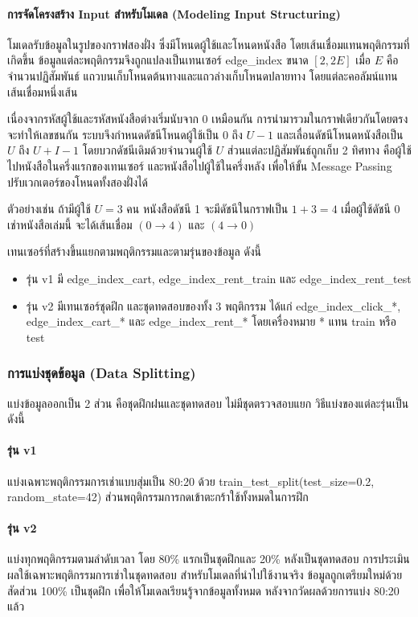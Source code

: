 \paragraph{การจัดโครงสร้าง Input สำหรับโมเดล (Modeling Input Structuring)}
โมเดลรับข้อมูลในรูปของกราฟสองฝั่ง ซึ่งมีโหนดผู้ใช้และโหนดหนังสือ โดยเส้นเชื่อมแทนพฤติกรรมที่เกิดขึ้น ข้อมูลแต่ละพฤติกรรมจึงถูกแปลงเป็นเทนเซอร์ edge\_index ขนาด $[2, 2E]$ เมื่อ $E$ คือจำนวนปฏิสัมพันธ์ แถวบนเก็บโหนดต้นทางและแถวล่างเก็บโหนดปลายทาง โดยแต่ละคอลัมน์แทนเส้นเชื่อมหนึ่งเส้น

เนื่องจากรหัสผู้ใช้และรหัสหนังสือต่างเริ่มนับจาก $0$ เหมือนกัน การนำมารวมในกราฟเดียวกันโดยตรงจะทำให้เลขชนกัน ระบบจึงกำหนดดัชนีโหนดผู้ใช้เป็น $0$ ถึง $U-1$ และเลื่อนดัชนีโหนดหนังสือเป็น $U$ ถึง $U+I-1$ โดยบวกดัชนีเดิมด้วยจำนวนผู้ใช้ $U$ ส่วนแต่ละปฏิสัมพันธ์ถูกเก็บ 2 ทิศทาง คือผู้ใช้ไปหนังสือในครึ่งแรกของเทนเซอร์ และหนังสือไปผู้ใช้ในครึ่งหลัง เพื่อให้ขั้น Message Passing ปรับเวกเตอร์ของโหนดทั้งสองฝั่งได้

ตัวอย่างเช่น ถ้ามีผู้ใช้ $U=3$ คน หนังสือดัชนี 1 จะมีดัชนีในกราฟเป็น $1+3=4$ เมื่อผู้ใช้ดัชนี 0 เช่าหนังสือเล่มนี้ จะได้เส้นเชื่อม $(0 \rightarrow 4)$ และ $(4 \rightarrow 0)$

เทนเซอร์ที่สร้างขึ้นแยกตามพฤติกรรมและตามรุ่นของข้อมูล ดังนี้
\begin{itemize}
    \item รุ่น v1 มี edge\_index\_cart, edge\_index\_rent\_train และ edge\_index\_rent\_test
    \item รุ่น v2 มีเทนเซอร์ชุดฝึก และชุดทดสอบของทั้ง 3 พฤติกรรม ได้แก่ edge\_index\_click\_*, edge\_index\_cart\_* และ edge\_index\_rent\_* โดยเครื่องหมาย * แทน train หรือ test
\end{itemize}

\subsubsection{การแบ่งชุดข้อมูล (Data Splitting)}
แบ่งข้อมูลออกเป็น 2 ส่วน คือชุดฝึกฝนและชุดทดสอบ ไม่มีชุดตรวจสอบแยก วิธีแบ่งของแต่ละรุ่นเป็นดังนี้

\paragraph{รุ่น v1}
แบ่งเฉพาะพฤติกรรมการเช่าแบบสุ่มเป็น 80:20 ด้วย train\_test\_split(test\_size=0.2, random\_state=42) ส่วนพฤติกรรมการกดเข้าตะกร้าใช้ทั้งหมดในการฝึก

\paragraph{รุ่น v2}
แบ่งทุกพฤติกรรมตามลำดับเวลา โดย 80\% แรกเป็นชุดฝึกและ 20\% หลังเป็นชุดทดสอบ การประเมินผลใช้เฉพาะพฤติกรรมการเช่าในชุดทดสอบ สำหรับโมเดลที่นำไปใช้งานจริง ข้อมูลถูกเตรียมใหม่ด้วยสัดส่วน 100\% เป็นชุดฝึก เพื่อให้โมเดลเรียนรู้จากข้อมูลทั้งหมด หลังจากวัดผลด้วยการแบ่ง 80:20 แล้ว

